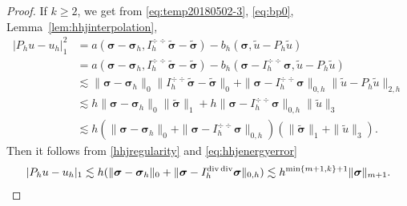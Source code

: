 \begin{proof}
If $k\geq2$, we get from \eqref{eq:temp20180502-3}, \eqref{eq:bp0}, Lemma~\ref{lem:hhjinterpolation},
\begin{align*}
|P_hu-u_h|_1^2&=a(\boldsymbol\sigma-\boldsymbol\sigma_h, I_h^{\div\div}\widetilde{\boldsymbol{\sigma}}-\widetilde{\boldsymbol{\sigma}})-b_h(\boldsymbol\sigma, \widetilde{u}-P_h\widetilde{u}) \\
&=a(\boldsymbol\sigma-\boldsymbol\sigma_h, I_h^{\div\div}\widetilde{\boldsymbol{\sigma}}-\widetilde{\boldsymbol{\sigma}})-b_h(\boldsymbol\sigma-I_h^{\div\div}\boldsymbol\sigma, \widetilde{u}-P_h\widetilde{u}) \\
&\lesssim \|\boldsymbol\sigma-\boldsymbol\sigma_h\|_0\|I_h^{\div\div}\widetilde{\boldsymbol{\sigma}}-\widetilde{\boldsymbol{\sigma}}\|_0+\|\boldsymbol\sigma-I_h^{\div\div}\boldsymbol\sigma\|_{0,h}\|\widetilde{u}-P_h\widetilde{u}\|_{2,h} \\
&\lesssim h\|\boldsymbol\sigma-\boldsymbol\sigma_h\|_0\|\widetilde{\boldsymbol{\sigma}}\|_1+h\|\boldsymbol\sigma-I_h^{\div\div}\boldsymbol\sigma\|_{0,h}\|\widetilde{u}\|_{3} \\
&\lesssim h(\|\boldsymbol\sigma-\boldsymbol\sigma_h\|_0+\|\boldsymbol\sigma-I_h^{\div\div}\boldsymbol\sigma\|_{0,h})(\|\widetilde{\boldsymbol{\sigma}}\|_1+\|\widetilde{u}\|_{3}).
\end{align*}
Then it follows from \eqref{hhjregularity} and \eqref{eq:hhjenergyerror}
\begin{align*}
|P_hu-u_h|_1\lesssim h(\|\boldsymbol\sigma-\boldsymbol\sigma_h\|_0+\|\boldsymbol\sigma-I_h^{\operatorname{div}\operatorname{div}}\boldsymbol\sigma\|_{0,h})\lesssim h^{\min\{m+1,k\}+1}\|\boldsymbol\sigma\|_{m+1}.
\end{align*}
\end{proof}


